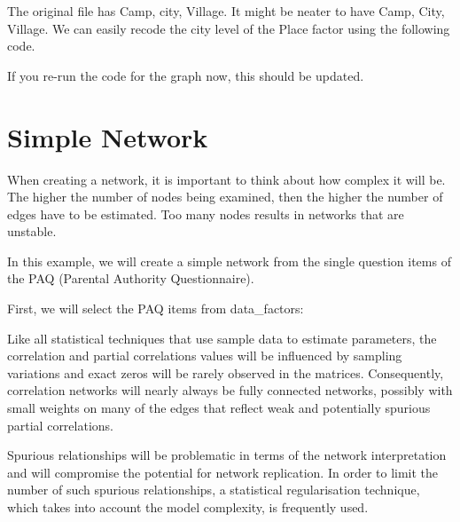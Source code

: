 \documentclass[]{book}
\newenvironment{Shaded}{\begin{snugshade}}{\end{snugshade}}
\newcommand{\DataTypeTok}[1]{\textcolor[rgb]{0.13,0.29,0.53}{#1}}
\newcommand{\KeywordTok}[1]{\textcolor[rgb]{0.13,0.29,0.53}{\textbf{#1}}}
\newcommand{\NormalTok}[1]{#1}
\newcommand{\OperatorTok}[1]{\textcolor[rgb]{0.81,0.36,0.00}{\textbf{#1}}}
\newcommand{\StringTok}[1]{\textcolor[rgb]{0.31,0.60,0.02}{#1}}
\begin{document}
The original file has Camp, city, Village. It might be neater to have Camp, City, Village. We can easily recode the city level of the Place factor using the following code.

If you re-run the code for the graph now, this should be updated.

\begin{Shaded}
\end{Shaded}

\hypertarget{simple-network}{%
\section{Simple Network}\label{simple-network}}

When creating a network, it is important to think about how complex it will be. The higher the number of nodes being examined, then the higher the number of edges have to be estimated. Too many nodes results in networks that are unstable.

In this example, we will create a simple network from the single question items of the PAQ (Parental Authority Questionnaire).

First, we will select the PAQ items from data\_factors:

\begin{Shaded}
\end{Shaded}

Like all statistical techniques that use sample data to estimate parameters, the correlation and partial correlations values will be influenced by sampling variations and exact zeros will be rarely observed in the matrices. Consequently, correlation networks will nearly always be fully connected networks, possibly with small weights on many of the edges that reflect weak and potentially spurious partial correlations.

Spurious relationships will be problematic in terms of the network interpretation and will compromise the potential for network replication. In order to limit the number of such spurious relationships, a statistical regularisation technique, which takes into account the model complexity, is frequently used.
\end{document}
